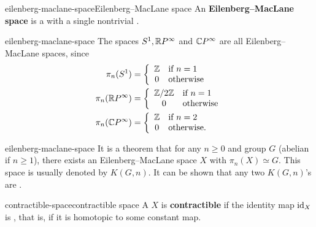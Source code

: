 \begin{topic}{eilenberg-maclane-space}{Eilenberg--MacLane space}
    An \textbf{Eilenberg--MacLane space} is a  with a single nontrivial .
\end{topic}

\begin{example}{eilenberg-maclane-space}
    The spaces $S^1, \mathbb{R} P^\infty$ and $\mathbb{C} P^\infty$ are all Eilenberg--MacLane spaces, since
    \[ \begin{aligned}
        \pi_n(S^1) &= \left\{ \begin{array}{cl} \mathbb{Z} & \text{if } n = 1 \\ 0 & \text{otherwise} \end{array} \right. \\
        \pi_n(\mathbb{R} P^\infty) &= \left\{ \begin{array}{cl} \mathbb{Z}/2\mathbb{Z} & \text{if } n = 1 \\ 0 & \text{otherwise} \end{array} \right. \\
        \pi_n(\mathbb{C} P^\infty) &= \left\{ \begin{array}{cl} \mathbb{Z} & \text{if } n = 2 \\ 0 & \text{otherwise} . \end{array} \right.
    \end{aligned} \]
\end{example}

\begin{example}{eilenberg-maclane-space}
    It is a theorem that for any $n \ge 0$ and group $G$ (abelian if $n \ge 1$), there exists an Eilenberg--MacLane space $X$ with $\pi_n(X) \simeq G$. This space is usually denoted by $K(G, n)$. It can be shown that any two $K(G, n)$'s are .
\end{example}

\begin{topic}{contractible-space}{contractible space}
    A  $X$ is \textbf{contractible} if the identity map $\text{id}_X$ is , that is, if it is homotopic to some constant map.
\end{topic}

